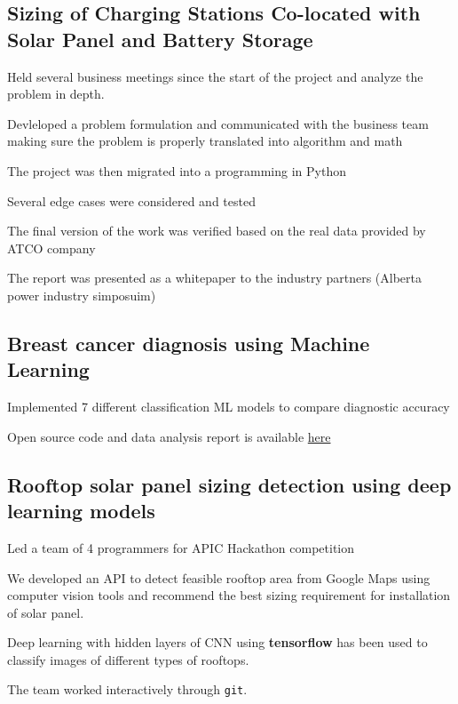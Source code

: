 \documentclass[letter,11pt]{article}
\begin{document}
	\subsection{Sizing of Charging Stations Co-located with Solar Panel and Battery Storage}
\begin{zitemize}
	\item Held several business meetings since the start of the project and analyze the problem in depth.
	\item Devleloped a problem formulation and communicated with the business team making sure the problem is properly translated into algorithm and math
	\item The project was then migrated into a programming in Python
	\item Several edge cases were considered and tested
	\item The final version of the work was verified based on the real data provided by ATCO company
	\item The report was presented as a whitepaper to the industry partners (Alberta power industry simposuim)
\end{zitemize}


\subsection{Breast cancer diagnosis using Machine Learning}
\begin{zitemize}
	\item Implemented 7 different classification ML models to compare diagnostic accuracy
	\item Open source code and data analysis report is available \href{https://github.com/Hadi2525/applied_ML/blob/master/Breast_cancer_ML/BC_ML.py}{here}
\end{zitemize}	
\subsection{Rooftop solar panel sizing detection using deep learning models}
\begin{zitemize}
 \item Led a team of 4 programmers for APIC Hackathon competition 
	\item We developed an API to detect feasible rooftop area from Google Maps using computer vision tools and recommend the best sizing requirement for installation of solar panel. 
	\item Deep learning with hidden layers of CNN using \textbf{tensorflow} has been used to classify images of different types of rooftops. 
	\item The team worked interactively through \texttt{git}.
\end{zitemize}
\end{document}
